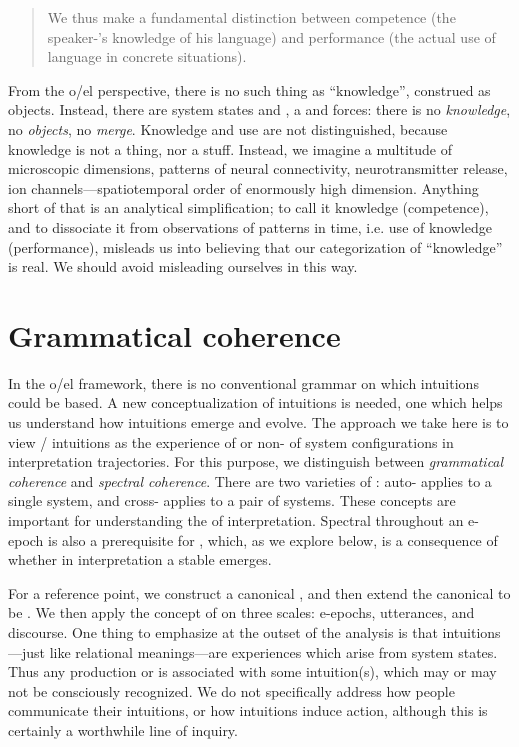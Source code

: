 \begin{quote}
We thus make a fundamental distinction between competence (the speaker-'s knowledge of his language) and performance (the actual use of language in concrete situations). \citep[4]{Chomsky1965}
\end{quote}


  From the o/el perspective, there is no such thing as “knowledge”, construed as objects. Instead, there are system states and , a  and forces: there is no \textit{knowledge}, no \textit{objects}, no \textit{merge}. Knowledge and use are not distinguished, because knowledge is not a thing, nor a stuff. Instead, we imagine a multitude of microscopic dimensions, patterns of neural connectivity, neurotransmitter release, ion channels—spatiotemporal order of enormously high dimension. Anything short of that is an analytical simplification; to call it knowledge (competence), and to dissociate it from observations of patterns in time, i.e. use of knowledge (performance), misleads us into believing that our categorization of “knowledge” is real. We should avoid misleading ourselves in this way.

\section{Grammatical coherence}

In the o/el framework, there is no conventional grammar on which  intuitions could be based. A new conceptualization of intuitions is needed, one which helps us understand how intuitions emerge and evolve. The approach we take here is to view / intuitions as the experience of  or non- of system configurations in interpretation trajectories. For this purpose, we distinguish between \textit{grammatical coherence} and \textit{spectral coherence}. There are two varieties of : auto- applies to a single system, and cross- applies to a pair of systems. These concepts are important for understanding the  of interpretation. Spectral  throughout an e-epoch is also a prerequisite for , which, as we explore below, is a consequence of whether in interpretation a stable  emerges.

For a reference point, we construct a canonical , and then extend the canonical  to be . We then apply the concept of  on three scales: e-epochs, utterances, and discourse. One thing to emphasize at the outset of the analysis is that intuitions—just like relational meanings—are experiences which arise from system states. Thus any production or  is associated with some intuition(s), which may or may not be consciously recognized. We do not specifically address how people communicate their intuitions, or how intuitions induce action, although this is certainly a worthwhile line of inquiry.

